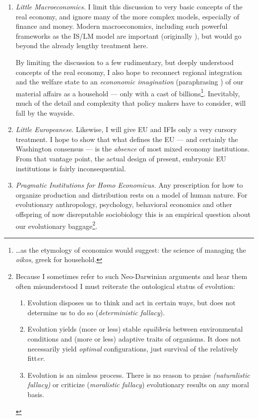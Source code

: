 \documentclass[11pt,a4paper,oneside,openright]{article}
\begin{document}
\begin{enumerate}
	\item \label{it:little_macroeconomics} \emph{Little Macroeconomics.} I limit this discussion to very basic concepts of the real economy, and ignore many of the more complex models, especially of finance and money. Modern macroeconomics, including such powerful frameworks as the IS/LM model are important (originally \citealt{Hicks1937}), but would go beyond the already lengthy treatment here. 

	By limiting the discussion to a few rudimentary, but deeply understood concepts of the real economy, I also hope to reconnect regional integration and the welfare state to an \emph{econonomic imagination} (paraphrasing \citealt{Mills-1959-aa}) of our material affairs as a household --- only with a cast of billions\footnote
		{\ldots as the etymology of economics would suggest: the science of managing the \emph{oikos}, greek for household.}. 
	Inevitably, much of the detail and complexity that policy makers have to consider, will fall by the wayside. 

	\item \label{it:little_europeanese} \emph{Little Europeanese}. Likewise, I will give \gls{EU} and \glspl{IFI}  only a very cursory treatment. I hope to show that what defines the \gls{EU} --- and certainly the Washington consensus --- is the \emph{absence} of most mixed economy institutions. From that vantage point, the actual design of present, embryonic \gls{EU} institutions is fairly inconsequential.

	\item \label{it:homo_economicus} \emph{Pragmatic Institutions for Homo Economicus.}  Any prescription for how to organize production and distribution rests on a model of human nature. For evolutionary anthropology, psychology, behavioral economics and other offspring of now disreputable \citep{Wright1994} sociobiology \citep{Wilson1975} this is an empirical question about our evolutionary baggage\footnote{
		Because I sometimes refer to such Neo-Darwinian arguments \citep{Wright1994} and hear them often misunderstood I must reiterate the ontological status of evolution:
		\begin{enumerate}
			\item Evolution disposes us to think and act in certain ways, but does not determine us to do so (\emph{deterministic fallacy}).
			\item	 Evolution yields (more or less) stable \emph{equilibria} between environmental conditions and (more or less) adaptive traits of organisms. It does not necessarily yield \emph{optimal} configurations, just survival of the relatively fitt\emph{er}. 
			\item Evolution is an aimless process. There is no reason to praise \emph{(naturalistic fallacy)} or criticize (\emph{moralistic fallacy}) evolutionary results on any moral basis.
		\end{enumerate} }.
	

\end{enumerate}
\end{document}
